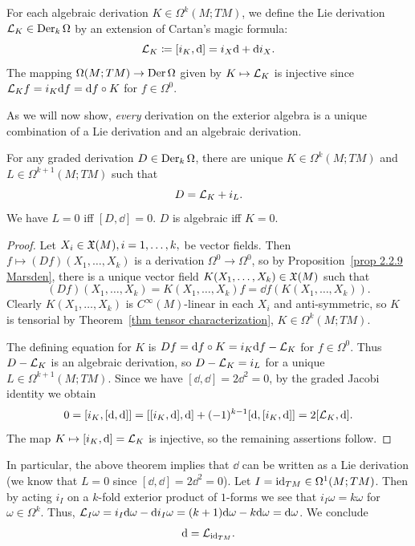 \begin{defn}
    For each algebraic derivation $K\in\Omega^k(M;TM)$, we define the Lie derivation $\mathcal{L}_K\in\operatorname{Der}_k\Omega$ by an extension of Cartan's magic formula:
    \[\mathcal{L}_K\coloneqq [i_K,{\mathrm{d}}]=i_X{\mathrm{d}}+{\mathrm{d}} i_X.\]
    The mapping $\Omega(M;TM)\to \operatorname{Der}\Omega$ given by $K\mapsto \mathcal{L}_K$ is injective since $\mathcal{L}_K f=i_K{\mathrm{d}} f={\mathrm{d}} f\circ K$ for $f\in\Omega^0$.
\end{defn}

As we will now show, \emph{every} derivation on the exterior algebra is a unique combination of a Lie derivation and an algebraic derivation.

\begin{thm}\label{thm 8.3 Kolar}
    For any graded derivation $D\in\operatorname{Der}_k\Omega$, there are unique $K\in\Omega^k(M;TM)$ and $L\in\Omega^{k+1}(M;TM)$ such that 
    \[D=\mathcal{L}_K+i_L.\]
    We have $L=0$ iff $[D,\dd]=0$. $D$ is algebraic iff $K=0$.
\end{thm}
\begin{proof}
    Let $X_i\in\mathfrak{X}(M),i=1,\ldots,k,$ be vector fields. Then $f\mapsto (Df)(X_1,\ldots,X_k)$ is a derivation $\Omega^0\to \Omega^0$, so by Proposition~\ref{prop 2.2.9 Marsden}, there is a unique vector field $K(X_1,\ldots,X_k)\in\mathfrak{X}(M)$ such that 
    \[(Df)(X_1,\ldots,X_k)=K(X_1,\ldots,X_k)f=\dd f(K(X_1,\ldots,X_k)).\]
    Clearly $K(X_1,\ldots,X_k)$ is $C^\infty(M)$-linear in each $X_i$ and anti-symmetric, so $K$ is tensorial by Theorem~\ref{thm tensor characterization}, $K\in\Omega^k(M;TM)$.

    The defining equation for $K$ is $Df={\mathrm{d}} f\circ K=i_K{\mathrm{d}} f-\mathcal{L}_K$ for $f\in\Omega^0$. Thus $D-\mathcal{L}_K$ is an algebraic derivation, so $D-\mathcal{L}_K=i_L$ for a unique $L\in\Omega^{k+1}(M;TM)$. Since we have $[\dd,\dd]=2\dd^2=0$, by the graded Jacobi identity we obtain
    \[0=[i_K,[{\mathrm{d}},{\mathrm{d}}]]=[[i_K,{\mathrm{d}}],{\mathrm{d}}]+(-1)^{k-1}[{\mathrm{d}},[i_K,{\mathrm{d}}]]=2[\mathcal{L}_K,{\mathrm{d}}].\]
    The map $K\mapsto [i_K,{\mathrm{d}}]=\mathcal{L}_K$ is injective, so the remaining assertions follow.
\end{proof}


\begin{rem}
    In particular, the above theorem implies that $\dd$ can be written as a Lie derivation (we know that $L=0$ since $[\dd,\dd]=2\dd^2=0$). Let $I=\operatorname{id}_{TM}\in\Omega^1(M;TM)$. Then by acting $i_I$ on a $k$-fold exterior product of $1$-forms we see that $i_I \omega=k\omega$ for $\omega\in\Omega^k$. Thus, $\mathcal{L}_{I}\omega=i_I{\mathrm{d}}\omega-{\mathrm{d}} i_I\omega=(k+1){\mathrm{d}}\omega-k{\mathrm{d}}\omega={\mathrm{d}}\omega$. We conclude
    \[{\mathrm{d}}=\mathcal{L}_{\operatorname{id}_{TM}}.\]
\end{rem}

